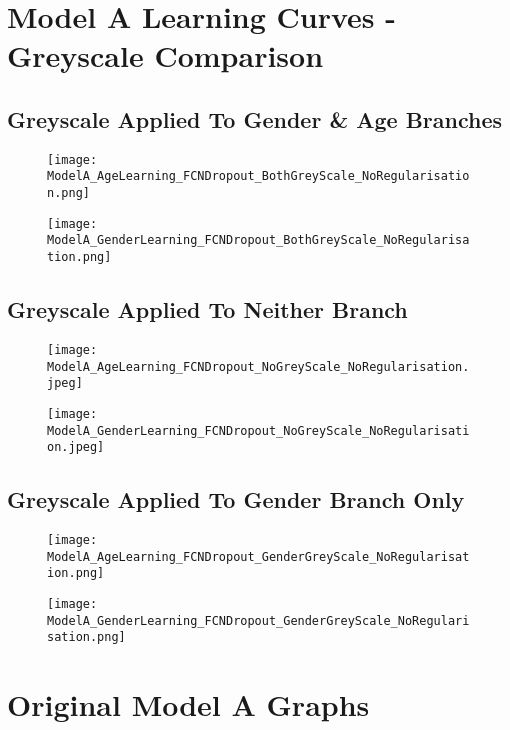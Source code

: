 \section*{Model A Learning Curves - Greyscale Comparison}

\subsection*{Greyscale Applied To Gender \& Age Branches}
\begin{figure}[h!]
    \centering
    \texttt{[image: ModelA\_AgeLearning\_FCNDropout\_BothGreyScale\_NoRegularisation.png]}
\end{figure}
\begin{figure}[h!]
    \centering
    \texttt{[image: ModelA\_GenderLearning\_FCNDropout\_BothGreyScale\_NoRegularisation.png]}
\end{figure}
\newpage

\subsection*{Greyscale Applied To Neither Branch}
\begin{figure}[h!]
    \centering
    \texttt{[image: ModelA\_AgeLearning\_FCNDropout\_NoGreyScale\_NoRegularisation.jpeg]}
\end{figure}
\begin{figure}[h!]
    \centering
    \texttt{[image: ModelA\_GenderLearning\_FCNDropout\_NoGreyScale\_NoRegularisation.jpeg]}
\end{figure}
\newpage

\subsection*{Greyscale Applied To Gender Branch Only}
\begin{figure}[h!]
    \centering
    \texttt{[image: ModelA\_AgeLearning\_FCNDropout\_GenderGreyScale\_NoRegularisation.png]}
\end{figure}
\begin{figure}[h!]
    \centering
    \texttt{[image: ModelA\_GenderLearning\_FCNDropout\_GenderGreyScale\_NoRegularisation.png]}
\end{figure}
\newpage

\section*{Original Model A Graphs}
